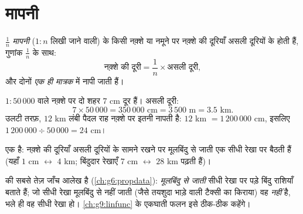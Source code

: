 \section{मापनी}

\begin{definition}[मापनी]\label{def:g7:prop:scale}
$\frac{1}{n}$ \emph{मापनी} ($1 : n$ लिखी जाने वाली) के
किसी नक़्शे या नमूने पर नक़्शे की दूरियाँ असली दूरियों के 
होती हैं, गुणांक $\frac1n$ के साथ:
\[
\text{नक़्शे की दूरी} = \frac{1}{n} \times \text{असली दूरी},
\]
और दोनों \emph{एक ही मात्रक} में नापी जाती हैं।
\end{definition}

\begin{example}\label{ex:g7:prop:scale}
$1 : 50\,000$  वाले नक़्शे पर दो शहर $7$ cm दूर हैं। असली दूरी:
\[
7 \times 50\,000 = 350\,000 \text{ cm} = 3\,500 \text{ m} = 3.5
\text{ km}.
\]
उलटी तरफ़, $12$ km लंबी पैदल राह नक़्शे पर इतनी नापती है:
$12$ km $= 1\,200\,000$ cm, इसलिए $1\,200\,000 \div 50\,000 = 24$ cm।
\end{example}

\begin{omfigure}

{\small {} एक  है: नक़्शे की दूरियाँ असली दूरियों के
सामने रखने पर मूलबिंदु से जाती एक सीधी रेखा पर बैठती हैं (यहाँ
$1$ cm $\leftrightarrow$ $4$ km; बिंदुदार रेखाएँ $7$ cm
$\leftrightarrow$ $28$ km पढ़ती हैं)।}
\end{omfigure}

\begin{remark}
 की सबसे तेज़ जाँच आलेख है (\cref{ch:g6:propdata}):
\emph{मूलबिंदु से जाती} सीधी रेखा पर पड़े बिंदु  राशियाँ
बताते हैं; जो सीधी रेखा मूलबिंदु से नहीं जाती (जैसे तयशुदा भाड़े
वाली टैक्सी का किराया) वह  \emph{नहीं} है, भले ही वह सीधी
रेखा हो। \cref{ch:g9:linfunc} के एकघाती फलन इसे ठीक-ठीक कहेंगे।
\end{remark}

